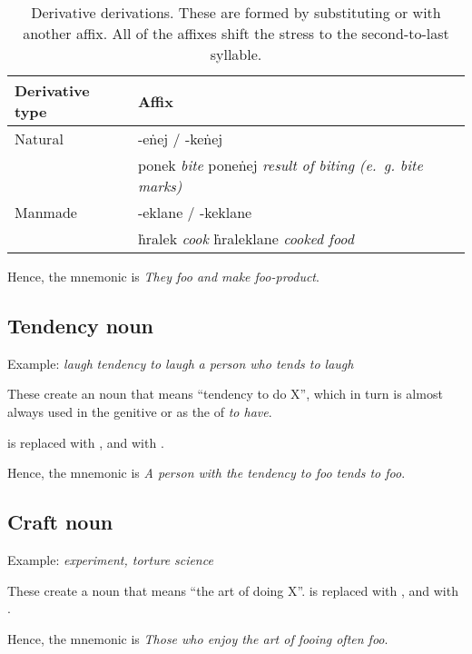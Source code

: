 \documentclass{book}
\begin{document}
\begin{table}[ht]
    \caption{Derivative derivations. These are formed by substituting  or  with another affix. All of the affixes shift the stress to the second-to-last syllable.}
    \centering
    \begin{tabular}{|l|l|l|}
        \hline
        Derivative type & Affix \\
        \hline
        Natural & -eṅej / -keṅej \\
        & ponek \emph{bite} \ra{} poneṅej \emph{result of biting (e.~g. bite marks)} \\
        \hline
        Manmade & -eklane / -keklane \\
        & ḣralek \emph{cook} \ra{} ḣraleklane \emph{cooked food} \\
        \hline
    \end{tabular}
\end{table}

Hence, the mnemonic is  \emph{They foo and make foo-product}.

\subsection{Tendency noun}

Example:  \emph{laugh} \ra{}  \emph{tendency to laugh} \ra{}  \emph{a person who tends to laugh}

These create an noun that means ``tendency to do X'', which in turn is almost always used in the genitive or as the  of  \emph{to have}.

 is replaced with , and  with .

Hence, the mnemonic is  \emph{A person with the tendency to foo tends to foo}.

\subsection{Craft noun}

Example:  \emph{experiment, torture} \ra{}  \emph{science}

These create a noun that means ``the art of doing X''.  is replaced with , and  with .

Hence, the mnemonic is  \emph{Those who enjoy the art of fooing often foo}.
\end{document}
